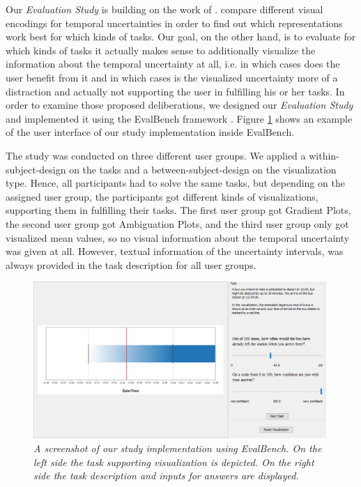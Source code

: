 Our \textit{Evaluation Study} is building on the work of \citet{gschwandtner2016visual}. \citet{gschwandtner2016visual} compare different visual encodings for temporal uncertainties in order to find out which representations work best for which kinds of tasks. Our goal, on the other hand, is to evaluate for which kinds of tasks it actually makes sense to additionally visualize the information about the temporal uncertainty at all, i.e. in which cases does the user benefit from it and in which cases is the visualized uncertainty more of a distraction and actually not supporting the user in fulfilling his or her tasks. In order to examine those proposed deliberations, we designed our \textit{Evaluation Study} and implemented it using the EvalBench framework \cite{aigner2013evalbench}. Figure \ref{fig:EvalBench_GUI} shows an example of the user interface of our study implementation inside EvalBench. \par \medskip

The study was conducted on three different user groups. We applied a within-subject-design on the tasks and a between-subject-design on the visualization type. Hence, all participants had to solve the same tasks, but depending on the assigned user group, the participants got different kinds of visualizations, supporting them in fulfilling their tasks. The first user group got Gradient Plots, the second user group got Ambiguation Plots, and the third user group only got visualized mean values, so no visual information about the temporal uncertainty was given at all. However, textual information of the uncertainty intervals, was always provided in the task description for all user groups. \par \medskip

\begin{figure}[H]
	\centering
	\includegraphics[width=0.99\textwidth]{figures/EvalBench_GUI.png}
	\caption{\textit{A screenshot of our study implementation using EvalBench. On the left side the task supporting visualization is depicted. On the right side the task description and inputs for answers are displayed.}}
	\label{fig:EvalBench_GUI}
\end{figure}

